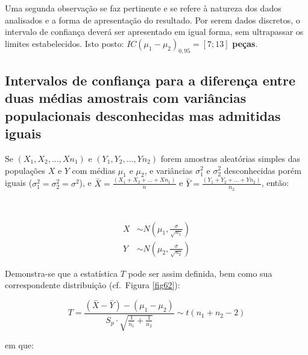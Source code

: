 \documentclass[
]{book}
\begin{document}
\hfill\break

Uma segunda observação se faz pertinente e se refere à natureza dos dados analisados e a forma de apresentação do resultado. Por serem dados discretos, o intervalo de confiança deverá ser apresentado em igual forma, sem ultrapassar os limites estabelecidos. Isto posto: \(IC (\mu_{1} - \mu_{2})_{0,95} = [7; 13]\) \textbf{peças}.

\hfill\break

\hypertarget{intervalos-de-confianuxe7a-para-a-diferenuxe7a-entre-duas-muxe9dias-amostrais-com-variuxe2ncias-populacionais-desconhecidas-mas-admitidas-iguais}{%
\subsection{Intervalos de confiança para a diferença entre duas médias amostrais com variâncias populacionais desconhecidas mas admitidas iguais}\label{intervalos-de-confianuxe7a-para-a-diferenuxe7a-entre-duas-muxe9dias-amostrais-com-variuxe2ncias-populacionais-desconhecidas-mas-admitidas-iguais}}

\hfill\break

Se \((X_{1}, X_{2},...,X{n_{1}})\) e \((Y_{1}, Y_{2},...,Y{n_{2}})\) forem amostras aleatórias simples das populações \(X\) e \(Y\) com médias \(\mu_{1}\) e \(\mu_{2}\), e variâncias \(\sigma_{1}^{2}\) e \(\sigma_{2}^{2}\) desconhecidas porém iguais (\(\sigma_{1}^{2}=\sigma_{2}^{2}=\sigma^{2}\)), e \(\stackrel{-}{X}=\frac{(X_{1}+X_{2}+...+X{n_{1}})}{n}\) e \(\stackrel{-}{Y}=\frac{(Y_{1}+Y_{2}+...+Y{n_{2}})}{n_{2}}\), então:

~

\begin{align*}
{X}  & \sim N( \mu_{1} ,  \frac{\sigma}{\sqrt{n_{1}}} )\\
{Y}  & \sim N( \mu_{2} ,  \frac{\sigma}{\sqrt{n_{2}}} )
\end{align*}

\hfill\break

Demonstra-se que a estatística \(T\) pode ser assim definida, bem como sua correspondente distribuição (cf.~Figura \ref{fig62}):

\hfill\break

\[
T = \frac{   (\stackrel{-}{X}-\stackrel{-}{Y})   - (\mu_{1}-\mu_{2})}{S_{p} \cdot \sqrt{\frac{1}{n_{1}} + \frac{1}{n_{2}} }      }  \sim t(n_{1}+n_{2}-2)
\]

\hfill\break

em que:

\hfill\break
\end{document}
